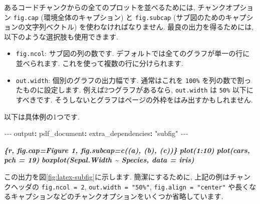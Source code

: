 \documentclass[
  11pt,
  lualatex,
  ja=standard]{bxjsreport}
\newenvironment{Shaded}{\begin{snugshade}}{\end{snugshade}}
\newcommand{\AttributeTok}[1]{\textcolor[rgb]{0.77,0.63,0.00}{#1}}
\newcommand{\FunctionTok}[1]{\textcolor[rgb]{0.00,0.00,0.00}{#1}}
\newcommand{\InformationTok}[1]{\textcolor[rgb]{0.56,0.35,0.01}{\textbf{\textit{#1}}}}
\newcommand{\KeywordTok}[1]{\textcolor[rgb]{0.13,0.29,0.53}{\textbf{#1}}}
\newcommand{\PreprocessorTok}[1]{\textcolor[rgb]{0.56,0.35,0.01}{\textit{#1}}}
\newcommand{\StringTok}[1]{\textcolor[rgb]{0.31,0.60,0.02}{#1}}
\begin{document}
あるコードチャンクからの全てのプロットを並べるためには, チャンクオプション \texttt{fig.cap} (環境全体のキャプション) と \texttt{fig.subcap} (サブ図のためのキャプションの文字列ベクトル) を使わなければなりません. 最良の出力を得るためには, 以下のような選択肢も使用できます.

\begin{itemize}
\item
  \texttt{fig.ncol}: サブ図の列の数です. デフォルトでは全てのグラフが単一の行に並べられます. これを使って複数の行に分けられます.
\item
  \texttt{out.width}: 個別のグラフの出力幅です. 通常はこれを \texttt{100\%} を列の数で割ったものに設定します. 例えば2つグラフがあるなら, \texttt{out.width} は \texttt{50\%} 以下にすべきです. そうしないとグラフはページの外枠をはみ出すかもしれません.
\end{itemize}

以下は具体例の1つです.

\begin{Shaded}
\begin{Highlighting}[]
\PreprocessorTok{{-}{-}{-}}
\FunctionTok{output}\KeywordTok{:}
\AttributeTok{  }\FunctionTok{pdf\_document}\KeywordTok{:}
\AttributeTok{    }\FunctionTok{extra\_dependencies}\KeywordTok{:}\AttributeTok{ }\StringTok{"subfig"}
\PreprocessorTok{{-}{-}{-}}
\end{Highlighting}
\end{Shaded}

\begin{Shaded}
\begin{Highlighting}[]
\InformationTok{\textasciigrave{}\textasciigrave{}\textasciigrave{}\{r, fig.cap=\textquotesingle{}Figure 1\textquotesingle{}, fig.subcap=c(\textquotesingle{}(a)\textquotesingle{}, \textquotesingle{}(b)\textquotesingle{}, \textquotesingle{}(c)\textquotesingle{})\}}
\InformationTok{plot(1:10)}
\InformationTok{plot(cars, pch = 19)}
\InformationTok{boxplot(Sepal.Width \textasciitilde{} Species, data = iris)}
\InformationTok{\textasciigrave{}\textasciigrave{}\textasciigrave{}}
\end{Highlighting}
\end{Shaded}

この出力を図\ref{fig:latex-subfig}に示します. 簡潔にするために, 上記の例はチャンクヘッダの \texttt{fig.ncol = 2}, \texttt{out.width = "50\%"}, \texttt{fig.align = "center"} や長くなるキャプションなどのチャンクオプションをいくつか省略しています.
\end{document}
